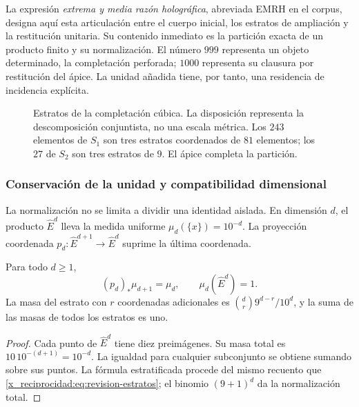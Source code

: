 La expresión \emph{extrema y media razón holográfica}, abreviada EMRH en
el corpus, designa aquí esta articulación entre el cuerpo inicial, los
estratos de ampliación y la restitución unitaria. Su contenido inmediato
es la partición exacta de un producto finito y su normalización. El número
\(999\) representa un objeto determinado, la completación perforada;
\(1000\) representa su clausura por restitución del ápice. La unidad
añadida tiene, por tanto, una residencia de incidencia explícita.

\begin{figure}[htbp]
\centering
{}
\caption{Estratos de la completación cúbica. La disposición representa
la descomposición conjuntista, no una escala métrica. Los \(243\) elementos
de \(S_1\) son tres estratos coordenados de \(81\) elementos; los \(27\)
de \(S_2\) son tres estratos de \(9\). El ápice completa la partición.}
\label{x_reciprocidad:fig:revision-emrh}
\end{figure}

\subsubsection{Conservación de la unidad y compatibilidad dimensional}

La normalización no se limita a dividir una identidad aislada. En dimensión
\(d\), el producto \(\widehat E^d\) lleva la medida uniforme
\(\mu_d(\{x\})=10^{-d}\). La proyección coordenada
\(p_d:\widehat E^{d+1}\to\widehat E^d\) suprime la última coordenada.

\begin{proposition}
Para todo \(d\geq1\),
\[
 (p_d)_*\mu_{d+1}=\mu_d,
 \qquad \mu_d(\widehat E^d)=1.
\]
La masa del estrato con \(r\) coordenadas adicionales es
\(\binom dr9^{d-r}/10^d\), y la suma de las masas de todos los estratos
es uno.
\end{proposition}
\begin{proof}
Cada punto de \(\widehat E^d\) tiene diez preimágenes. Su masa total es
\(10\,10^{-(d+1)}=10^{-d}\). La igualdad para cualquier subconjunto
se obtiene sumando sobre sus puntos. La fórmula estratificada procede
del mismo recuento que \eqref{x_reciprocidad:eq:revision-estratos}; el binomio
\((9+1)^d\) da la normalización total.
\end{proof}

